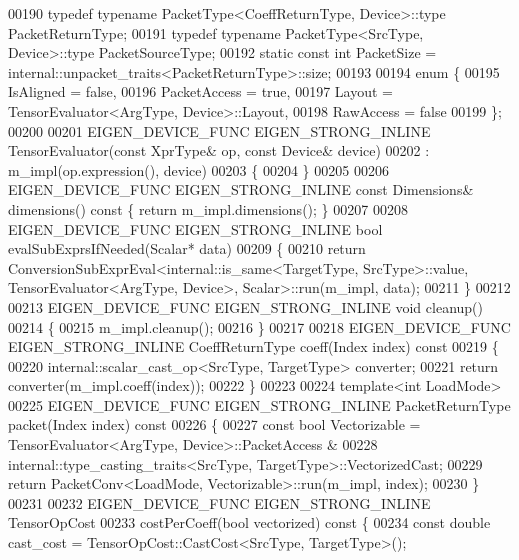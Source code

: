 \begin{DoxyCode}
00190   \textcolor{keyword}{typedef} \textcolor{keyword}{typename} PacketType<CoeffReturnType, Device>::type PacketReturnType;
00191   \textcolor{keyword}{typedef} \textcolor{keyword}{typename} PacketType<SrcType, Device>::type PacketSourceType;
00192   \textcolor{keyword}{static} \textcolor{keyword}{const} \textcolor{keywordtype}{int} PacketSize = internal::unpacket\_traits<PacketReturnType>::size;
00193 
00194   \textcolor{keyword}{enum} \{
00195     IsAligned = \textcolor{keyword}{false},
00196     PacketAccess = \textcolor{keyword}{true},
00197     Layout = TensorEvaluator<ArgType, Device>::Layout,
00198     RawAccess = \textcolor{keyword}{false}
00199   \};
00200 
00201   EIGEN\_DEVICE\_FUNC EIGEN\_STRONG\_INLINE TensorEvaluator(\textcolor{keyword}{const} XprType& op, \textcolor{keyword}{const} Device& device)
00202     : m\_impl(op.expression(), device)
00203   \{
00204   \}
00205 
00206   EIGEN\_DEVICE\_FUNC EIGEN\_STRONG\_INLINE \textcolor{keyword}{const} Dimensions& dimensions()\textcolor{keyword}{ const }\{ \textcolor{keywordflow}{return} m\_impl.dimensions(); 
      \}
00207 
00208   EIGEN\_DEVICE\_FUNC EIGEN\_STRONG\_INLINE \textcolor{keywordtype}{bool} evalSubExprsIfNeeded(Scalar* data)
00209   \{
00210     \textcolor{keywordflow}{return} ConversionSubExprEval<internal::is\_same<TargetType, SrcType>::value, TensorEvaluator<ArgType,
       Device>, Scalar>::run(m\_impl, data);
00211   \}
00212 
00213   EIGEN\_DEVICE\_FUNC EIGEN\_STRONG\_INLINE \textcolor{keywordtype}{void} cleanup()
00214   \{
00215     m\_impl.cleanup();
00216   \}
00217 
00218   EIGEN\_DEVICE\_FUNC EIGEN\_STRONG\_INLINE CoeffReturnType coeff(Index index)\textcolor{keyword}{ const}
00219 \textcolor{keyword}{  }\{
00220     internal::scalar\_cast\_op<SrcType, TargetType> converter;
00221     \textcolor{keywordflow}{return} converter(m\_impl.coeff(index));
00222   \}
00223 
00224   \textcolor{keyword}{template}<\textcolor{keywordtype}{int} LoadMode>
00225   EIGEN\_DEVICE\_FUNC EIGEN\_STRONG\_INLINE PacketReturnType packet(Index index)\textcolor{keyword}{ const}
00226 \textcolor{keyword}{  }\{
00227     \textcolor{keyword}{const} \textcolor{keywordtype}{bool} Vectorizable = TensorEvaluator<ArgType, Device>::PacketAccess &
00228         internal::type\_casting\_traits<SrcType, TargetType>::VectorizedCast;
00229     \textcolor{keywordflow}{return} PacketConv<LoadMode, Vectorizable>::run(m\_impl, index);
00230   \}
00231 
00232   EIGEN\_DEVICE\_FUNC EIGEN\_STRONG\_INLINE TensorOpCost
00233   costPerCoeff(\textcolor{keywordtype}{bool} vectorized)\textcolor{keyword}{ const }\{
00234     \textcolor{keyword}{const} \textcolor{keywordtype}{double} cast\_cost = TensorOpCost::CastCost<SrcType, TargetType>();

\end{DoxyCode}
